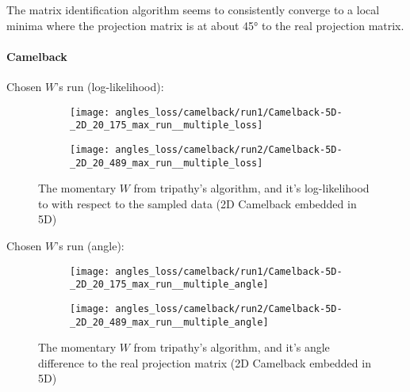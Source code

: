 The matrix identification algorithm seems to consistently converge to a local minima where the projection matrix is at about 45° to the real projection matrix.

\paragraph{Camelback}
Chosen $W$'s run (log-likelihood):
\begin{figure}[H]
    \centering
    \begin{subfigure}[b]{0.40\textwidth}
        \texttt{[image: angles\_loss/camelback/run1/Camelback-5D-\_2D\_20\_175\_max\_run\_\_multiple\_loss]}
        \label{fig:gull}
    \end{subfigure}
    \begin{subfigure}[b]{0.40\textwidth}
        \texttt{[image: angles\_loss/camelback/run2/Camelback-5D-\_2D\_20\_489\_max\_run\_\_multiple\_loss]}
        \label{fig:tiger}
    \end{subfigure}   
           \caption{The momentary $W$ from tripathy's algorithm, and it's log-likelihood to with respect to the sampled data (2D Camelback embedded in 5D)}
\end{figure}

Chosen $W$'s run (angle):
\begin{figure}[H]
    \centering
    \begin{subfigure}[b]{0.40\textwidth}
        \texttt{[image: angles\_loss/camelback/run1/Camelback-5D-\_2D\_20\_175\_max\_run\_\_multiple\_angle]}
        \label{fig:gull}
    \end{subfigure}
    \begin{subfigure}[b]{0.40\textwidth}
        \texttt{[image: angles\_loss/camelback/run2/Camelback-5D-\_2D\_20\_489\_max\_run\_\_multiple\_angle]}
        \label{fig:tiger}
    \end{subfigure}   
           \caption{The momentary $W$ from tripathy's algorithm, and it's angle difference to the real projection matrix (2D Camelback embedded in 5D)}
\end{figure}

